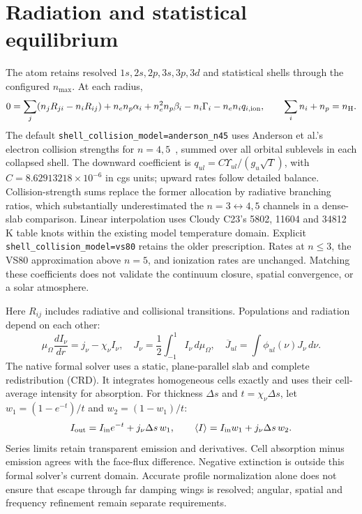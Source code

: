 \documentclass[10pt,a4paper]{article}
\begin{document}
\section{Radiation and statistical equilibrium}
The atom retains resolved $1s,2s,2p,3s,3p,3d$ and statistical shells through
the configured $n_{\max}$. At each radius,
\begin{equation}
 0=\sum_j(n_jR_{ji}-n_iR_{ij})+n_en_p\alpha_i+n_e^2n_p\beta_i
   -n_i\Gamma_i-n_en_iq_{i,\mathrm{ion}},
 \qquad \sum_i n_i+n_p=n_{\rm H}.
 \label{eq:se}
\end{equation}
The default \texttt{shell\_collision\_model=anderson\_n45} uses Anderson
et al.'s electron collision strengths for $n=4,5$~\cite{anderson}, summed over
all orbital sublevels in each collapsed shell. The downward coefficient is
$q_{ul}=C\Upsilon_{ul}/(g_u\sqrt{T})$, with
$C=8.62913218\times10^{-6}$ in cgs units; upward rates follow detailed balance.
Collision-strength sums replace the former allocation by radiative branching
ratios, which substantially underestimated the $n=3\leftrightarrow4,5$
channels in a dense-slab comparison. Linear interpolation uses Cloudy C23's
5802, 11604 and 34812 K table knots within the existing model temperature
domain. Explicit \texttt{shell\_collision\_model=vs80} retains the older
prescription. Rates at $n\leq3$, the VS80 approximation above $n=5$, and
ionization rates are unchanged. Matching these coefficients does not validate
the continuum closure, spatial convergence, or a solar atmosphere.

Here $R_{ij}$ includes radiative and collisional transitions. Populations
and radiation depend on each other:
\begin{equation}
 \mu_\Omega\frac{dI_\nu}{dr}=j_\nu-\chi_\nu I_\nu,
 \quad J_\nu=\frac12\int_{-1}^1I_\nu\,d\mu_\Omega,
 \quad \overline J_{ul}=\int\phi_{ul}(\nu)J_\nu\,d\nu.
 \label{eq:rt}
\end{equation}
The native formal solver uses a static, plane-parallel slab and complete
redistribution (CRD). It integrates homogeneous cells exactly and uses their
cell-average intensity for absorption. For thickness $\Delta s$ and
$t=\chi_\nu\Delta s$, let $w_1=(1-e^{-t})/t$ and $w_2=(1-w_1)/t$:
\begin{equation}
 I_{\rm out}=I_{\rm in}e^{-t}+j_\nu\Delta s\,w_1,
 \qquad \langle I\rangle=I_{\rm in}w_1+j_\nu\Delta s\,w_2.
 \label{eq:cell}
\end{equation}
Series limits retain transparent emission and derivatives. Cell absorption
minus emission agrees with the face-flux difference. Negative extinction is
outside this formal solver's current domain. Accurate profile normalization
alone does not ensure that escape through far damping wings is resolved;
angular, spatial and frequency refinement remain separate requirements.
\end{document}
